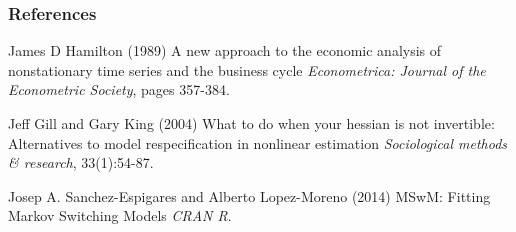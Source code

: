 \documentclass{beamer}
\begin{document}
\begin{frame}
\frametitle{References}
\footnotesize{
	\begin{thebibliography}{99} %
		 James D Hamilton (1989)
		\newblock A new approach to the economic analysis of nonstationary time series and the business cycle
		\newblock \emph{Econometrica: Journal of the Econometric Society}, pages 357-384.
	\end{thebibliography}
	\begin{thebibliography}{99} %
		 Jeff Gill and Gary King (2004)
		\newblock What to do when your hessian is not invertible:
		Alternatives to model respecification in nonlinear estimation
		\newblock \emph{Sociological
			methods \& research}, 33(1):54-87.
	\end{thebibliography}
	\begin{thebibliography}{99} %
		 Josep A. Sanchez-Espigares and Alberto Lopez-Moreno (2014)
		\newblock MSwM: Fitting Markov Switching Models
		\newblock \emph{CRAN R}.
	\end{thebibliography}
}
\end{frame}
\end{document}
